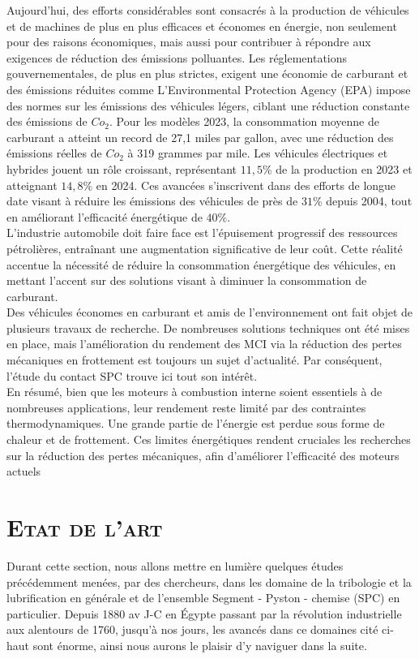Aujourd'hui, des efforts considérables sont consacrés à la production de véhicules et de machines de plus en plus efficaces et économes en énergie, non seulement pour des raisons économiques, mais aussi pour contribuer à répondre aux exigences de réduction des émissions polluantes. Les réglementations gouvernementales, de plus en plus strictes, exigent une économie de carburant et des émissions réduites comme L'Environmental Protection Agency (EPA) impose des normes sur les émissions des véhicules légers, ciblant une réduction constante des émissions de $Co_2$. Pour les modèles 2023, la consommation moyenne de carburant a atteint un record de 27,1 miles par gallon, avec une réduction des émissions réelles de $Co_2$ à 319 grammes par mile. Les véhicules électriques et hybrides jouent un rôle croissant, représentant $11,5\%$ de la production en 2023 et atteignant $14,8\%$ en 2024. Ces avancées s'inscrivent dans des efforts de longue date visant à réduire les émissions des véhicules de près de $31\%$ depuis 2004, tout en améliorant l'efficacité énergétique de $40\%.$ \cite{epa}\\

L'industrie automobile doit faire face est l'épuisement progressif des ressources pétrolières, entraînant une augmentation significative de leur coût. Cette réalité accentue la nécessité de réduire la consommation énergétique des véhicules, en mettant l'accent sur des solutions visant à diminuer la consommation de carburant.\\

Des véhicules économes en carburant et amis de l'environnement ont fait objet de plusieurs travaux de recherche. De nombreuses solutions techniques ont été mises en place, mais l'amélioration du rendement des MCI via la réduction des pertes mécaniques en frottement est toujours un sujet d'actualité.\cite{Amal} Par conséquent, l’étude du contact SPC trouve ici tout son intérêt.\\


En résumé, bien que les moteurs à combustion interne soient essentiels à de nombreuses applications, leur rendement reste limité par des contraintes thermodynamiques. Une grande partie de l'énergie est perdue sous forme de chaleur et de frottement. Ces limites énergétiques rendent cruciales les recherches sur la réduction des pertes mécaniques, afin d'améliorer l’efficacité des moteurs actuels

\section{\textsc{Etat de l'art}}\label{etat_art}
Durant cette section, nous allons mettre en lumière quelques études précédemment menées, par des chercheurs, dans les domaine de la tribologie et la lubrification en générale et de l'ensemble Segment - Pyston - chemise (SPC) en particulier. Depuis 1880 av J-C en Égypte passant par la révolution industrielle aux alentours de 1760, jusqu'à nos jours, les avancés dans ce domaines cité ci-haut sont énorme, ainsi nous aurons le plaisir d'y naviguer dans la suite.
